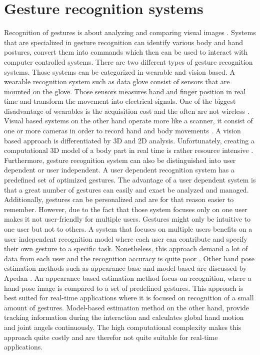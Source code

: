 \section{Gesture recognition systems}
\label{sec:handfreesensor}
Recognition of gestures is about analyzing and comparing visual images \cite{Pavlovic1997}. Systems that are specialized in gesture recognition can identify various body and hand postures, convert them into commands which then can be used to interact with computer controlled systems.
There are two different types of gesture recognition systems. Those systems can be categorized in wearable and vision based. A wearable recognition system such as data glove consist of sensors that are mounted on the glove. Those sensors measures hand and finger position in real time and transform the movement into electrical signals. One of the biggest disadvantage of wearables is the acquisition cost and the often are not wireless \cite{Gupta2001}. Visual based systems on the other hand operate more like a scanner, it consist of one or more cameras in order to record hand and body movements \cite{Bilal2013}. A vision based approach is differentiated by 3D and 2D analysis. Unfortunately, creating a computational 3D model of a body part in real time is rather resource intensive \cite{Gupta2001}. Furthermore, gesture recognition system can also be distinguished into user dependent or user independent. A user dependent recognition system has a predefined set of optimized gestures. The advantage of a user dependent system is that a great number of gestures can easily and exact be analyzed and managed. Additionally, gestures can be personalized and are for that reason easier to remember. However, due to the fact that those system focuses only on one user makes it not user-friendly for multiple users. 
Gestures might only be intuitive to one user but not to others. A system that focuses on multiple users benefits on a user independent recognition model where each user can contribute and specify their own gesture to a specific task. Nonetheless, this approach demand a lot of data from each user and the recognition accuracy is quite poor \cite{Kallio2006}.
Other hand pose estimation methods such as  appearance-base and model-based are discussed by Apedan \cite{Abedan2015}. An appearance based estimation method focus on recognition, where a hand pose image is compared to a set of predefined gestures. This approach is best suited for real-time applications where it is focused on recognition of a small amount of gestures. Model-based estimation method on the other hand, provide tracking information during the interaction and calculates global hand motion and joint angels continuously. The high computational complexity makes this approach quite costly and are therefor not quite suitable for real-time applications.


